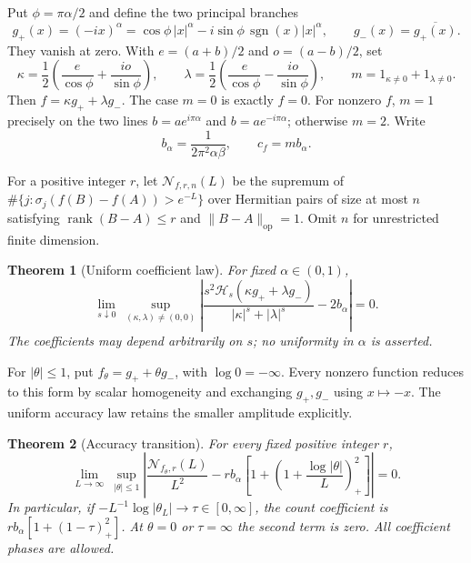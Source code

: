 \documentclass[11pt]{article}
\newtheorem{theorem}{Theorem}[section]
\numberwithin{equation}{section}
\newcommand{\rank}{\operatorname{rank}}
\newcommand{\sgn}{\operatorname{sgn}}
\newcommand{\op}{\mathrm{op}}
\newcommand{\cH}{\mathcal H}
\newcommand{\cN}{\mathcal N}
\begin{document}
Put $\phi=\pi\alpha/2$ and define the two principal branches
\[
 g_+(x)=(-ix)^\alpha
 =\cos\phi\,|x|^\alpha-i\sin\phi\,\sgn(x)|x|^\alpha,
 \qquad g_-(x)=\overline{g_+(x)}.
\]
They vanish at zero. With $e=(a+b)/2$ and $o=(a-b)/2$, set
\begin{equation}\label{eq:channels}
 \kappa=\frac12\left(\frac e{\cos\phi}
                         +\frac{io}{\sin\phi}\right),\qquad
 \lambda=\frac12\left(\frac e{\cos\phi}
                         -\frac{io}{\sin\phi}\right),\qquad
 m=1_{\kappa\ne0}+1_{\lambda\ne0}.
\end{equation}
Then $f=\kappa g_++\lambda g_-$. The case $m=0$ is exactly $f=0$.
For nonzero $f$, $m=1$ precisely on the two lines
$b=a e^{i\pi\alpha}$ and $b=a e^{-i\pi\alpha}$; otherwise $m=2$.
Write
\begin{equation}\label{eq:cf}
 b_\alpha=\frac1{2\pi^2\alpha\beta},\qquad c_f=m b_\alpha.
\end{equation}

For a positive integer $r$, let $\cN_{f,r,n}(L)$ be the supremum of
$\#\{j:\sigma_j(f(B)-f(A))>e^{-L}\}$ over Hermitian pairs of size at
most $n$ satisfying $\rank(B-A)\le r$ and $\|B-A\|_\op=1$.
Omit $n$ for unrestricted finite dimension.

\begin{theorem}[Uniform coefficient law]\label{thm:uniform}
For fixed $\alpha\in(0,1)$,
\begin{equation}\label{eq:uniform}
 \lim_{s\downarrow0}\ \sup_{(\kappa,\lambda)\ne(0,0)}
 \left|\frac{s^2\cH_s(\kappa g_++\lambda g_-)}
 {|\kappa|^s+|\lambda|^s}-2b_\alpha\right|=0.
\end{equation}
The coefficients may depend arbitrarily on $s$; no uniformity in
$\alpha$ is asserted.
\end{theorem}

For $|\theta|\le1$, put $f_\theta=g_++\theta g_-$, with
$\log0=-\infty$. Every nonzero function reduces to this form by scalar
homogeneity and exchanging $g_+,g_-$ using $x\mapsto-x$.
The uniform accuracy law retains the smaller amplitude explicitly.

\begin{theorem}[Accuracy transition]\label{thm:accuracy}
For every fixed positive integer $r$,
\begin{equation}\label{eq:accuracy}
 \lim_{L\to\infty}\ \sup_{|\theta|\le1}
 \left|\frac{\cN_{f_\theta,r}(L)}{L^2}
 -r b_\alpha\left[1+\left(1+\frac{\log|\theta|}{L}\right)_+^2\right]
 \right|=0.
\end{equation}
In particular, if $-L^{-1}\log|\theta_L|\to\tau\in[0,\infty]$,
the count coefficient is $r b_\alpha[1+(1-\tau)_+^2]$.
At $\theta=0$ or $\tau=\infty$ the second term is zero.
All coefficient phases are allowed.
\end{theorem}
\end{document}
